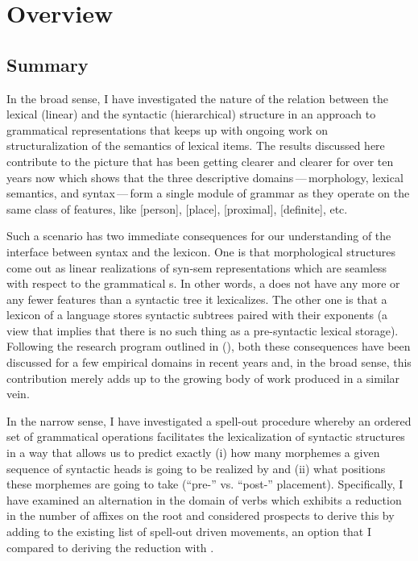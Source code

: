 \chapter{Overview}\label{chapter:conclusion}

\section{Summary}

In the broad sense, I have investigated the nature of the relation between the lexical (linear) and the syntactic (hierarchical) structure in an approach to grammatical representations that keeps up with ongoing work on structuralization of the semantics of lexical items. The results discussed here contribute to the picture that has been getting clearer and clearer for over ten years now which shows that the three descriptive domains\,---\,morphology, lexical semantics, and syntax\,---\,form a single module of grammar as they operate on the same class of features, like [person], [place], [proximal], [definite], etc.
\par
Such a scenario has two immediate consequences for our understanding of the interface between syntax and the lexicon.  One is that morphological structures come out as linear realizations of syn-sem representations  which are seamless with respect to the grammatical s. In other words, a  does not have any more or any fewer features than a syntactic tree it lexicalizes.  The other one is that a lexicon of a language stores syntactic subtrees paired with their exponents (a view that implies that there is no such thing as a pre-syntactic lexical storage). Following the research program outlined in \citeauthor{Starke2009} (\citeyear{Starke2009,StarkeLA}), both these consequences have been discussed for a few empirical domains in recent years and, in the broad sense, this contribution merely adds up to the growing body of work produced in a similar vein. 
\par
In the narrow sense, I have investigated a spell-out procedure whereby an ordered set of grammatical operations facilitates the  lexicalization of syntactic structures in a way that allows us to predict exactly (i) how many morphemes a given sequence of syntactic heads is going to be realized by and (ii) what positions these morphemes are going to take (``pre-'' vs. ``post-'' placement). Specifically, I have examined an  alternation in the domain of  verbs which exhibits a  reduction in the number of affixes on the root and considered prospects to derive this  by adding  to the existing list of spell-out driven movements, an option that I compared to deriving the reduction with .
